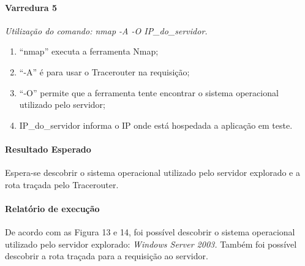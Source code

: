 \documentclass[
    12pt,               %
    openright,          %
    oneside,            %
    a4paper,            %
    section=TITLE,     %
    english,            %
    french,             %
    spanish,            %
    brazil              %
    ]{abntex2}
\begin{document}
\paragraph*{Varredura 5}

\emph{Utilização do comando: nmap -A -O IP\_do\_servidor.}



\begin{enumerate}[start=1]
	
\item \textquotedblleft{}nmap\textquotedblright{} executa a ferramenta Nmap;
	
\item \textquotedblleft{}-A\textquotedblright{} é para usar o Tracerouter na requisição;
	
\item \textquotedblleft{}-O\textquotedblright{} permite que a ferramenta tente encontrar o sistema operacional utilizado pelo servidor;
	
\item IP\_do\_servidor informa o IP onde está hospedada a aplicação em teste.

\end{enumerate}


\paragraph*{Resultado Esperado}

Espera-se descobrir o sistema operacional utilizado pelo servidor explorado e a rota traçada pelo Tracerouter.






\paragraph*{Relatório de execução}

De acordo com as Figura 13 e 14, foi possível descobrir o sistema operacional utilizado pelo servidor explorado: \emph{Windows Server 2003.} Também foi possível descobrir a rota traçada para a requisição ao servidor.
\end{document}
